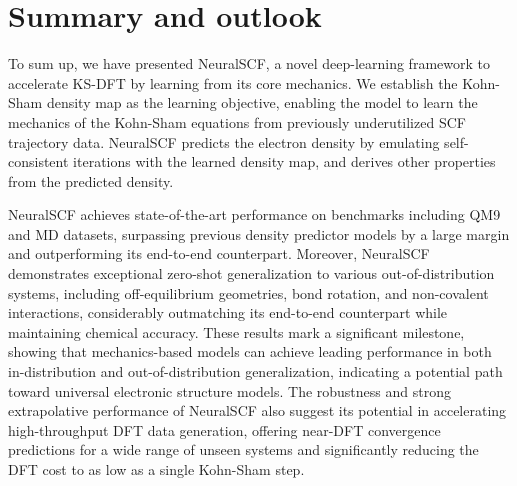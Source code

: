 \documentclass[%
reprint,
superscriptaddress,
bibnotes,
amsmath,amssymb,
aps,
floatfix, %
]{revtex4-2}
\begin{document}
\section{\label{sec:discussion}Summary and outlook}

To sum up, we have presented NeuralSCF, a novel deep-learning framework to accelerate KS-DFT by learning from its core mechanics. We establish the Kohn-Sham density map as the learning objective, enabling the model to learn the mechanics of the Kohn-Sham equations from previously underutilized SCF trajectory data. NeuralSCF predicts the electron density by emulating self-consistent iterations with the learned density map, and derives other properties from the predicted density.

NeuralSCF achieves state-of-the-art performance on benchmarks including QM9 and MD datasets, surpassing previous density predictor models by a large margin and outperforming its end-to-end counterpart. Moreover, NeuralSCF demonstrates exceptional zero-shot generalization to various out-of-distribution systems, including off-equilibrium geometries, bond rotation, and non-covalent interactions, considerably outmatching its end-to-end counterpart while maintaining chemical accuracy. These results mark a significant milestone, showing that mechanics-based models can achieve leading performance in both in-distribution and out-of-distribution generalization, indicating a potential path toward universal electronic structure models. The robustness and strong extrapolative performance of NeuralSCF also suggest its potential in accelerating high-throughput DFT data generation, offering near-DFT convergence predictions for a wide range of unseen systems and significantly reducing the DFT cost to as low as a single Kohn-Sham step.
\end{document}
